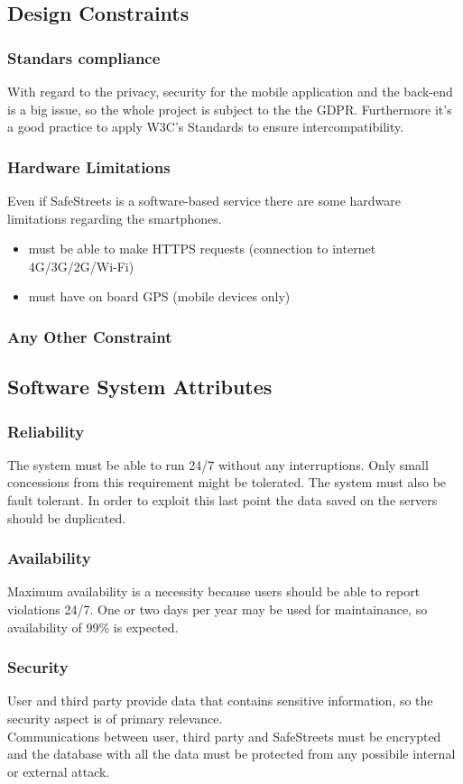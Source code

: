 \documentclass{article}
\begin{document}
\subsection{Design Constraints}
\subsubsection{Standars compliance}
With regard to the privacy, security for the mobile application and the back-end
is a big issue, so the whole project is subject to the the GDPR. Furthermore
it's a good practice to apply W3C's Standards to ensure intercompatibility.
\subsubsection{Hardware Limitations}
Even if SafeStreets is a software-based service there are some hardware
limitations regarding the smartphones.
\begin{itemize}
    \item must be able to make HTTPS requests (connection to internet
    4G/3G/2G/Wi-Fi)
    \item must have on board GPS (mobile devices only)
\end{itemize}
\subsubsection{Any Other Constraint}
\subsection{Software System Attributes}
\subsubsection{Reliability}
The system must be able to run 24/7 without any interruptions. Only small
concessions from this requirement might be tolerated. The system must also be
fault tolerant. In order to exploit this last point the data saved on the
servers should be duplicated.
\subsubsection{Availability}
Maximum availability is a necessity because users should be able to report
violations 24/7. One or two days per year may be used for maintainance, so 
availability of 99\% is expected.
\subsubsection{Security}
User and third party provide data that contains sensitive information, so the
security aspect is of primary relevance.\\ Communications between user, third
party and SafeStreets must be encrypted and the database with all the data must
be protected from any possibile internal or external attack.
\end{document}
